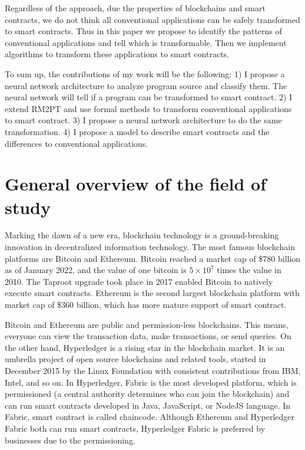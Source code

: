 Regardless of the approach,
due the properties of blockchains and smart contracts, we do not think all conventional applications can be safely transformed to smart contracts.
Thus in this paper we propose to identify the patterns of conventional applications and tell which is transformable.
Then we implement algorithms to transform these applications to smart contracts.

To sum up, the contributions of my work will be the following:
1) I propose a neural network architecture to analyze program source and classify them. The neural network will tell if a program can be transformed to smart contract.
2) I extend RM2PT and use formal methods to transform conventional applications to smart contract.
3) I propose a neural network architecture to do the same transformation.
4) I propose a model to describe smart contracts and the differences to conventional applications.



\section{General overview of the field of study}


Marking the dawn of a new era, blockchain technology is a ground-breaking innovation in decentralized information technology.
The most famous blockchain platforms are Bitcoin and Ethereum.
Bitcoin reached a market cap of \$780 billion as of January 2022, and the value of one bitcoin is $5 \times 10^7$ times the value in 2010.
The Taproot upgrade took place in 2017 enabled Bitcoin to natively execute smart contracts.
Ethereum is the second largest blockchain platform with market cap of \$360 billion, which has more mature support of smart contract.

Bitcoin and Ethereum are public and permission-less blockchains.
This means, everyone can view the transaction data, make transactions, or send queries.
On the other hand, Hyperledger is a rising star in the blockchain market. It is an umbrella project of open source blockchains and related tools, started in December 2015 by the Linux Foundation with consistent contributions from IBM, Intel, and so on.
In Hyperledger, Fabric is the most developed platform, which is permissioned (a central authority determines who can join the blockchain) and can run smart contracts developed in Java, JavaScript, or NodeJS language.
In Fabric, smart contract is called chaincode. Although Ethereum and Hyperledger Fabric both can run smart contracts, Hyperledger Fabric is preferred by businesses due to the permissioning.


